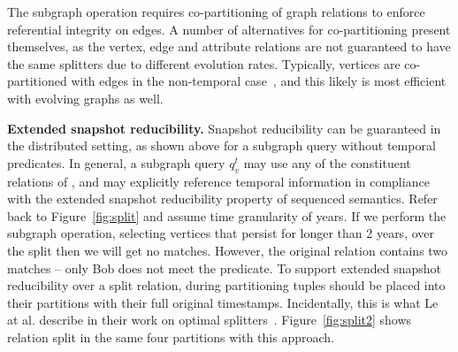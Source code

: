 The subgraph operation requires co-partitioning of graph relations to
enforce referential integrity on edges.  A number of alternatives for
co-partitioning present themselves, as the
vertex, edge and attribute relations are not guaranteed to have the
same splitters due to different evolution rates.  Typically, vertices
are co-partitioned with edges in the non-temporal
case~\cite{DBLP:conf/osdi/GonzalezXDCFS14}, and this likely is most
efficient with evolving graphs as well.




{\bf Extended snapshot reducibility.}  Snapshot reducibility can be
guaranteed in the distributed setting, as shown above for a subgraph
query without temporal predicates.  In general, a subgraph query
$q^t_v$ may use any of the constituent relations of \tve, and may
explicitly reference temporal information in compliance with the
extended snapshot reducibility property of sequenced semantics.  Refer
back to Figure~\ref{fig:split} and assume time granularity of years.
If we perform the subgraph operation, selecting vertices that persist
for longer than 2 years, over the split then we will get no matches.
However, the original relation contains two matches -- only Bob
does not meet the predicate.  To support
extended snapshot reducibility over a split relation, during
partitioning tuples should be placed into their partitions with their
full original timestamps.  Incidentally, this is what Le at
al. describe in their work on optimal splitters~\cite{Le2013}.
Figure~\ref{fig:split2} shows relation  split in the same
four partitions with this approach.

